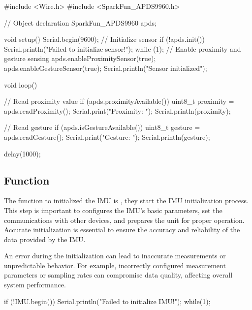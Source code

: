 \begin{code}
\begin{Arduino}
	#include <Wire.h>
	#include <SparkFun_APDS9960.h>
	
	// Object declaration
	SparkFun_APDS9960 apds;
	
	void setup() {
		Serial.begin(9600);
		// Initialize sensor
		if (!apds.init()) {
			Serial.println("Failed to initialize sensor!");
			while (1);
		}
		// Enable proximity and gesture sensing
		apds.enableProximitySensor(true);
		apds.enableGestureSensor(true);
		Serial.println("Sensor initialized");
	}
	
	void loop() {
		// Read proximity value
		if (apds.proximityAvailable()) {
			uint8_t proximity = apds.readProximity();
			Serial.print("Proximity: ");
			Serial.println(proximity);
		}
		
		// Read gesture
		if (apds.isGestureAvailable()) {
			uint8_t gesture = apds.readGesture();
			Serial.print("Gesture: ");
			Serial.println(gesture);
		}
		
		delay(1000);
	}
	
\end{Arduino}
\caption{Example ADPS-9960}

\end{code}







\subsection{Function }


The function to initialized the IMU is , they start the IMU initialization process. This step is important to configures the IMU's basic parameters, set the communications with other devices, and prepares the unit for proper operation. Accurate initialization is essential to ensure the accuracy and reliability of the data provided by the IMU.

An error during the initialization can lead to inaccurate measurements or unpredictable behavior. For example, incorrectly configured measurement parameters or sampling rates can compromise data quality, affecting overall system performance.


\begin{Arduino}
	if (!IMU.begin()) {
		Serial.println("Failed to initialize IMU!");
		while(1){};	}
\end{Arduino}


